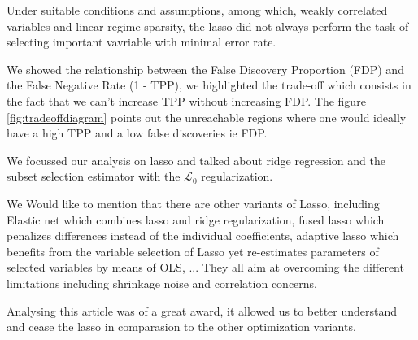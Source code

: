 \documentclass[10pt,onecolumn,letterpaper]{article}
\begin{document}
Under suitable conditions and assumptions, among which, weakly correlated variables and linear regime sparsity, the lasso did not always perform the task of selecting important vavriable with minimal error rate.
\newline 

We showed the relationship between the False Discovery Proportion (FDP) and the False Negative Rate (1 - TPP), we highlighted the trade-off which consists in the fact that we can't increase TPP without increasing FDP. The figure \ref{fig:tradeoffdiagram} points out the unreachable regions where one would ideally have a high TPP and a low false discoveries ie FDP.
\newline 

We focussed our analysis on lasso and talked about ridge regression and the subset selection estimator with the $\mathcal{L}_0$ regularization. 

We Would like to mention that there are other variants of Lasso, including Elastic net which combines lasso and ridge regularization, fused lasso which penalizes differences instead of the individual coefficients, adaptive lasso which benefits from the variable selection of Lasso yet re-estimates parameters of selected variables by means of OLS, ... They all aim at overcoming the different limitations including shrinkage noise and correlation concerns.
\newline

Analysing this article was of a great award, it allowed us to better understand and cease the lasso in comparasion to the other optimization variants. 
\end{document}
